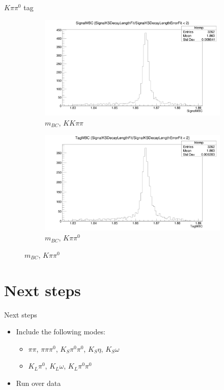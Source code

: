 \documentclass{beamer}
\begin{document}
\begin{frame}{$K\pi\pi^0$ tag}
  \begin{figure}
    \centering
    \begin{subfigure}{0.5\textwidth}
      \centering
      \includegraphics[width=\textwidth]{Kpipi0DoubleTag_SignalMBC.png}
      \caption{$m_{BC}$, $KK\pi\pi$}
    \end{subfigure}%
    \begin{subfigure}{0.5\textwidth}
      \centering
      \includegraphics[width=\textwidth]{Kpipi0DoubleTag_TagMBC.png}
      \caption{$m_{BC}$, $K\pi\pi^0$}
    \end{subfigure}
  \end{figure}
\end{frame}

\section{Next steps}
\begin{frame}{Next steps}
  \begin{itemize}
    \item{Include the following modes:}
    \begin{itemize}
      \item{$\pi\pi$, $\pi\pi\pi^0$, $K_S\pi^0\pi^0$, $K_S\eta$, $K_S\omega$}
      \item{$K_L\pi^0$, $K_L\omega$, $K_L\pi^0\pi^0$}
    \end{itemize}
    \item{Run over data}
  \end{itemize}
\end{frame}
\end{document}
